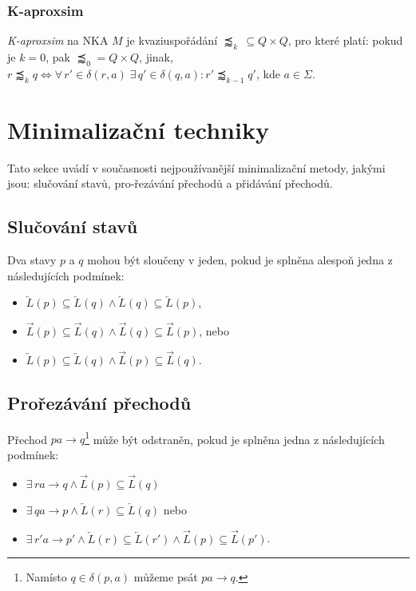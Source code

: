         \subsubsection*{K-aproxsim}
            \textit{K-aproxsim} na NKA $M$ je kvaziuspořádání $\precapprox_k\, \subseteq Q \times Q$, pro které platí: pokud je $k = 0$, pak $\precapprox_0 = Q \times Q$, jinak, $r \precapprox_{k} q \iff \forall\, r' \in \delta(r, a)\;\exists\, q' \in \delta(q, a): r' \precapprox_{k-1} q'$, kde $a \in \Sigma$.

\section{Minimalizační techniky}
    Tato sekce uvádí v současnosti nejpoužívanější minimalizační metody, jakými jsou: slučování stavů, pro-řezávání přechodů a přidávání přechodů.

    \subsection{Slučování stavů}
        Dva stavy $p$ a $q$ mohou být sloučeny v jeden, pokud je splněna alespoň jedna z následujících podmínek:
        \begin{itemize}
            \item $\overleftarrow{L}(p) \subseteq \overleftarrow{L}(q) \land \overleftarrow{L}(q) \subseteq \overleftarrow{L}(p)$,
            \item $\overrightarrow{L}(p) \subseteq \overrightarrow{L}(q) \land \overrightarrow{L}(q) \subseteq \overrightarrow{L}(p)$, nebo
            \item $\overleftarrow{L}(p) \subseteq \overleftarrow{L}(q) \land \overrightarrow{L}(p) \subseteq \overrightarrow{L}(q)$.
        \end{itemize}

    \subsection{Prořezávání přechodů}
        Přechod $pa \rightarrow q$\footnote{Namísto $q \in \delta(p, a)$ můžeme psát $pa \rightarrow q$.} může být odstraněn, pokud je splněna jedna z následujících podmínek:
        \begin{itemize}
            \item $\exists\, ra\rightarrow q \land \overrightarrow{L}(p) \subseteq \overrightarrow{L}(q)$
            \item $\exists\, qa\rightarrow p \land \overleftarrow{L}(r) \subseteq \overleftarrow{L}(q)$ nebo
            \item $\exists\, r'a\rightarrow p' \land \overleftarrow{L}(r) \subseteq \overleftarrow{L}(r') \land \overrightarrow{L}(p) \subseteq \overrightarrow{L}(p')$.
        \end{itemize}

